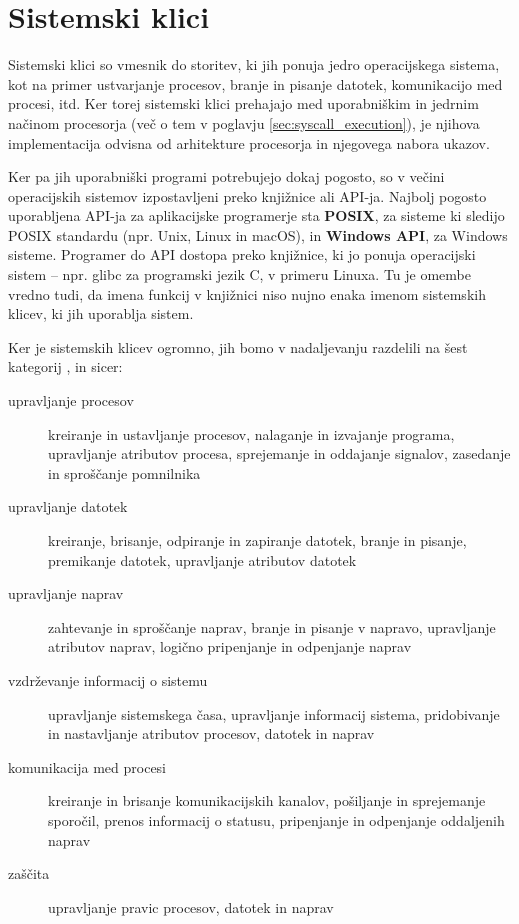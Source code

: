 \documentclass[a4paper,12pt,openright]{book}
\begin{document}
\section{Sistemski klici} \label{sec:syscalls}

Sistemski klici so vmesnik do storitev, ki jih ponuja jedro operacijskega sistema, kot na primer ustvarjanje procesov, branje in pisanje datotek, komunikacijo med procesi, itd.
Ker torej sistemski klici prehajajo med uporabniškim in jedrnim načinom procesorja (več o tem v poglavju \ref{sec:syscall_execution}), je njihova implementacija odvisna od arhitekture procesorja in njegovega nabora ukazov.

Ker pa jih uporabniški programi potrebujejo dokaj pogosto, so v večini operacijskih sistemov izpostavljeni preko knjižnice ali API-ja.
Najbolj pogosto uporabljena API-ja za aplikacijske programerje sta \textbf{POSIX}, za sisteme ki sledijo POSIX standardu (npr. Unix, Linux in macOS), in \textbf{Windows API}, za Windows sisteme.
Programer do API dostopa preko knjižnice, ki jo ponuja operacijski sistem -- npr. glibc za programski jezik C, v primeru Linuxa.
Tu je omembe vredno tudi, da imena funkcij v knjižnici niso nujno enaka imenom sistemskih klicev, ki jih uporablja sistem.

Ker je sistemskih klicev ogromno, jih bomo v nadaljevanju razdelili na šest kategorij \cite{Silberschatz_Galvin_Gagne_2018}, in sicer:
\begin{description}
	\item[upravljanje procesov] kreiranje in ustavljanje procesov, nalaganje in izvajanje programa, upravljanje atributov procesa, sprejemanje in oddajanje signalov, zasedanje in sproščanje pomnilnika
	\item[upravljanje datotek] kreiranje, brisanje, odpiranje in zapiranje datotek, branje in pisanje, premikanje datotek, upravljanje atributov datotek
	\item[upravljanje naprav] zahtevanje in sproščanje naprav, branje in pisanje v napravo, upravljanje atributov naprav, logično pripenjanje in odpenjanje naprav
	\item[vzdrževanje informacij o sistemu] upravljanje sistemskega časa, upravljanje informacij sistema, pridobivanje in nastavljanje atributov procesov, datotek in naprav
	\item[komunikacija med procesi] kreiranje in brisanje komunikacijskih kanalov, pošiljanje in sprejemanje sporočil, prenos informacij o statusu, pripenjanje in odpenjanje oddaljenih naprav
	\item[zaščita] upravljanje pravic procesov, datotek in naprav
\end{description}
\end{document}
